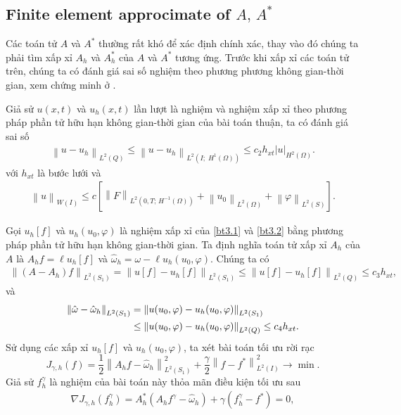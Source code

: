 \documentclass[]{article}
\begin{document}
\subsection{Finite element approcimate of $A,\, A^*$}
\qquad Các toán tử $A$ và $A^*$ thường rất khó để xác định chính xác, thay vào đó chúng ta phải tìm xấp xỉ $A_h$ và $A^*_h$ của $A$ và $A^*$ tương ứng. Trước khi xấp xỉ các toán tử trên, chúng ta có đánh giá sai số nghiệm theo phương phương không gian-thời gian, xem chứng minh ở \cite{a5}.
\begin{dl}\label{dl3.2}
	Giả sử $u(x, t)$ và $u_h(x, t)$ lần lượt là nghiệm và nghiệm xấp xỉ theo phương pháp phần tử hữu hạn không gian-thời gian của bài toán thuận, ta có đánh giá sai số
	\begin{align}\label{3.9}
	\left\| u-u_h\right\|_{L^2(Q)}\leq \left\| u-u_h\right\|_{L^2(I;\; H^1(\Omega))}\leq c_2h_{xt} \left|u\right|_{H^2(\Omega)}.
	\end{align}
	với $h_{xt}$ là bước lưới và
	\begin{align}\label{them}
	\left\|u \right\|_{W(I)}\leq c\left[\left\| F\right\|_{L^2(0, T;\, H^{-1}(\Omega))}+\left\|u_0 \right\|_{L^2(\Omega)}+\left\| \varphi\right\|_{L^2(S)}\right].
	\end{align}
\end{dl}
\noindent Gọi $u_h[f]$ và $u_h(u_0, \varphi)$ là nghiệm xấp xỉ của \cref{bt3.1} và \cref{bt3.2} bằng phương pháp phần tử hữu hạn không gian-thời gian. Ta định nghĩa toán tử xấp xỉ $A_h$ của $A$ là $A_hf=\ell u_h[f]$ và $\hat{\omega}_h=\omega-\ell u_h(u_0, \varphi)$. Chúng ta có
\begin{align}\label{3.11}
\left\| \left(A-A_h\right)f\right\|_{L^2(S_1)}=\left\| u[f]-u_h[f]\right\|_{L^2(S_1)}\leq \left\| u[f]-u_h[f]\right\|_{L^2(Q)}\leq c_3h_{xt},
\end{align}
và 
\begin{align}
\left\| \hat{\omega}-\hat{\omega}_h\right\|_{L^2(S_1)}&=\left\| u(u_0,\varphi)-u_h(u_0, \varphi)\right\|_{L^2(S_1)}\notag\\
&\leq \left\| u(u_0,\varphi)-u_h(u_0, \varphi)\right\|_{L^2(Q)}\leq c_4h_{xt}\label{3.12}.
\end{align}
Sử dụng các xấp xỉ $u_h[f]$ và $u_h(u_0, \varphi)$, ta xét bài toán tối ưu rời rạc
$$J_{\gamma, h}(f)=\frac{1}{2}\left\|A_hf-\hat{\omega}_h\right\|^2_{L^2(S_1)}+\frac{\gamma}{2}\left\|f-f^*\right\|^2_{L^2(I)}\to \min.$$
Giả sử $f^\gamma_h$ là nghiệm của bài toán này thỏa mãn điều kiện tối ưu sau
\begin{align}\label{3.13}
\nabla J_{\gamma, h}(f^\gamma_h)= A_h^*(A_hf^\gamma-\hat{\omega}_h)+\gamma(f^\gamma_h-f^*)=0,
\end{align}
\end{document}
